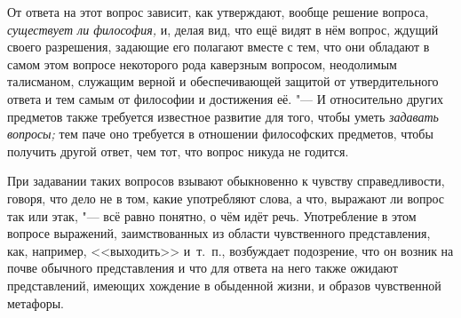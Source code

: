 От ответа на этот вопрос зависит, как утверждают, вообще решение вопроса,
{\em существует ли философия,} и, делая вид, что ещё
видят в нём вопрос, ждущий своего разрешения, задающие его полагают вместе
с тем, что они обладают в самом этом вопросе некоторого рода каверзным
вопросом, неодолимым талисманом, служащим верной и обеспечивающей защитой
от утвердительного ответа и тем самым от философии и достижения её. "--- И
относительно других предметов также требуется известное развитие для того,
чтобы уметь {\em задавать вопросы;} тем паче оно
требуется в отношении философских предметов, чтобы получить другой ответ,
чем тот, что вопрос никуда не годится.

При задавании таких вопросов взывают обыкновенно к чувству справедливости,
говоря, что дело не в том, какие употребляют слова, а что, выражают ли
вопрос так или этак, "--- всё равно понятно, о чём идёт речь. Употребление в
этом вопросе выражений, заимствованных из области чувственного
представления, как, например, <<выходить>> и~т.~п., возбуждает подозрение,
что он возник на почве обычного представления и что для ответа на него
также ожидают представлений, имеющих хождение в обыденной жизни, и образов
чувственной метафоры.

